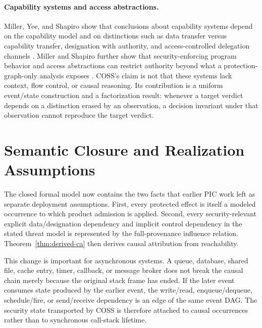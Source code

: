 \documentclass[10pt,twocolumn]{article}
\newcommand{\Model}{\textnormal{\textsc{COSS}}\xspace}
\begin{document}
\paragraph{Capability systems and access abstractions.}
Miller, Yee, and Shapiro show that conclusions about capability systems depend
on the capability model and on distinctions such as data transfer versus
capability transfer, designation with authority, and access-controlled
delegation channels \cite{miller_yee_shapiro2003}.  Miller and Shapiro further
show that security-enforcing program behavior and access abstractions can
restrict authority beyond what a protection-graph-only analysis exposes
\cite{miller_shapiro2003}.  \Model's claim is not that these systems lack
context, flow control, or causal reasoning.  Its contribution is a uniform
event/state construction and a factorization result: whenever a target verdict
depends on a distinction erased by an observation, a decision invariant under
that observation cannot reproduce the target verdict.

\section{Semantic Closure and Realization Assumptions}

The closed formal model now contains the two facts that earlier PIC work left as
separate deployment assumptions. First, every protected effect is itself a
modeled occurrence to which product admission is applied. Second, every
security-relevant explicit data/designation dependency and implicit control
dependency in the stated threat model is represented by the full-provenance
influence relation. Theorem~\ref{thm:derived-ca} then derives causal attribution
from reachability.

This change is important for asynchronous systems. A queue, database, shared
file, cache entry, timer, callback, or message broker does not break the causal
chain merely because the original stack frame has ended. If the later event
consumes state produced by the earlier event, the write/read, enqueue/dequeue,
schedule/fire, or send/receive dependency is an edge of the same event DAG.
The security state transported by \Model is therefore attached to causal
occurrences rather than to synchronous call-stack lifetime.
\end{document}
